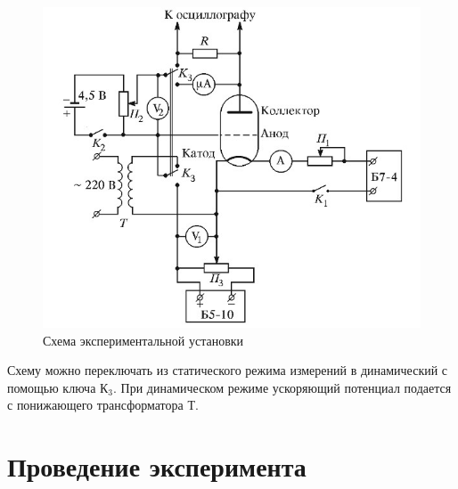 \documentclass[14pt, a4paper]{report}
\begin{document}
\begin{figure}[H]
\centering
\includegraphics[scale=0.6]{../images/521-3}
\caption{Схема экспериментальной установки}
\end{figure}

Схему можно переключать из статического режима измерений в динамический  с помощью ключа $К_3$. При динамическом режиме ускоряющий потенциал подается с понижающего трансформатора Т.

\section{Проведение эксперимента}
\end{document}
